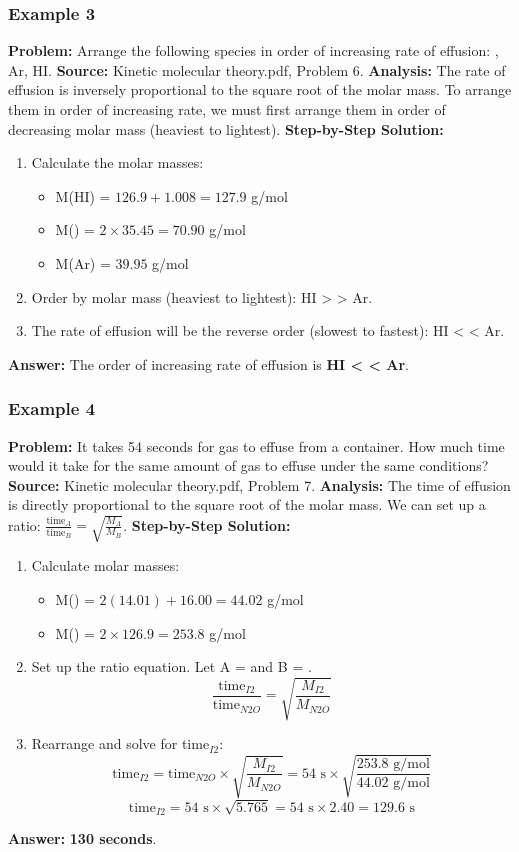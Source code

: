 \documentclass{article}
\begin{document}
\subsubsection{Example 3}
\textbf{Problem:} Arrange the following species in order of increasing rate of effusion: , Ar, HI.
\textbf{Source:} Kinetic molecular theory.pdf, Problem 6.
\textbf{Analysis:} The rate of effusion is inversely proportional to the square root of the molar mass. To arrange them in order of increasing rate, we must first arrange them in order of decreasing molar mass (heaviest to lightest).
\textbf{Step-by-Step Solution:}
\begin{enumerate}
    \item Calculate the molar masses:
    \begin{itemize}
        \item M(HI) = $126.9 + 1.008 = 127.9$ g/mol
        \item M() = $2 \times 35.45 = 70.90$ g/mol
        \item M(Ar) = $39.95$ g/mol
    \end{itemize}
    \item Order by molar mass (heaviest to lightest): HI >  > Ar.
    \item The rate of effusion will be the reverse order (slowest to fastest): HI <  < Ar.
\end{enumerate}
\textbf{Answer:} The order of increasing rate of effusion is \textbf{HI <  < Ar}.

\subsubsection{Example 4}
\textbf{Problem:} It takes 54 seconds for  gas to effuse from a container. How much time would it take for the same amount of  gas to effuse under the same conditions?
\textbf{Source:} Kinetic molecular theory.pdf, Problem 7.
\textbf{Analysis:} The time of effusion is directly proportional to the square root of the molar mass. We can set up a ratio: $\frac{\text{time}_A}{\text{time}_B} = \sqrt{\frac{M_A}{M_B}}$.
\textbf{Step-by-Step Solution:}
\begin{enumerate}
    \item Calculate molar masses:
    \begin{itemize}
        \item M() = $2(14.01) + 16.00 = 44.02$ g/mol
        \item M() = $2 \times 126.9 = 253.8$ g/mol
    \end{itemize}
    \item Set up the ratio equation. Let A =  and B = .
    \[ \frac{\text{time}_{I2}}{\text{time}_{N2O}} = \sqrt{\frac{M_{I2}}{M_{N2O}}} \]
    \item Rearrange and solve for time$_{I2}$:
    \[ \text{time}_{I2} = \text{time}_{N2O} \times \sqrt{\frac{M_{I2}}{M_{N2O}}} = 54 \text{ s} \times \sqrt{\frac{253.8 \text{ g/mol}}{44.02 \text{ g/mol}}} \]
    \[ \text{time}_{I2} = 54 \text{ s} \times \sqrt{5.765} = 54 \text{ s} \times 2.40 = 129.6 \text{ s} \]
\end{enumerate}
\textbf{Answer:} \textbf{130 seconds}.
\end{document}

